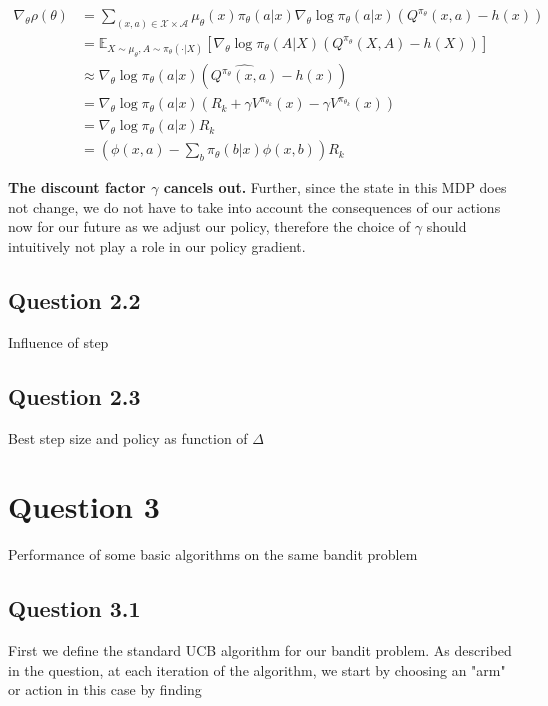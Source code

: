 \documentclass[a4paper, 11pt]{article} %
\begin{document}
\begin{align} \nabla_{\theta} \rho(\theta) 
&=\sum_{(x, a) \in \mathcal{X} \times \mathcal{A}} \mu_{\theta}(x) \pi_{\theta}(a | x) \nabla_{\theta} \log \pi_{\theta}(a | x)\left(Q^{\pi_\theta}(x, a)-h(x)\right) \\
&=\mathbb{E}_{X \sim \mu_{\theta}, A \sim \pi_{\theta}(\cdot | X)}\left[\nabla_{\theta} \log \pi_{\theta}(A | X)\left(Q^{\pi_{\theta}}(X, A)-h(X)\right)\right] \\
&\approx \nabla_{\theta} \log \pi_{\theta}(a | x)  \left(\widehat{Q^{\pi_{\theta}}(x, a)}-h(x)\right) \\
&=\nabla_{\theta} \log \pi_{\theta}(a | x)  \left(R_{k}+\gamma V^{\pi_{\theta_{k}}}(x) - \gamma V^{\pi_{\theta_{k}}}(x)\right) \\
&=\nabla_{\theta} \log \pi_{\theta}(a | x)  R_{k} \\
&=\left(  \phi(x, a)-\sum_{b} \pi_{\theta}(b|x) \phi(x, b)\right)R_{k} 
\end{align}

\textbf{The discount factor $\gamma$ cancels out.} Further, since the state in this MDP does not change, we do not have to take into account the consequences of our actions now for our future as we adjust our policy, therefore the choice of  $\gamma$ should intuitively not play a role in our policy gradient.

\subsection*{Question 2.2}

Influence of step 

\subsection*{Question 2.3}

Best step size and policy as function of $\Delta$

\section*{Question 3}

Performance of some basic algorithms on the same bandit problem
\subsection*{Question 3.1}

First we define the standard UCB algorithm for our bandit problem. As described in the question, at each iteration of the algorithm, we start by choosing an "arm" or action in this case by finding 
\end{document}
